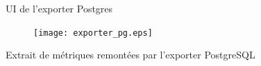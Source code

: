 
\begin{frame}[fragile]{UI de l'exporter Postgres}

\begin{figure}
\begin{center}
\texttt{[image: exporter\_pg.eps]}
\end{center}
\end{figure}

\end{frame}


\begin{frame}[fragile,shrink=5]{Extrait de métriques remontées par l'exporter PostgreSQL}


\end{frame}
